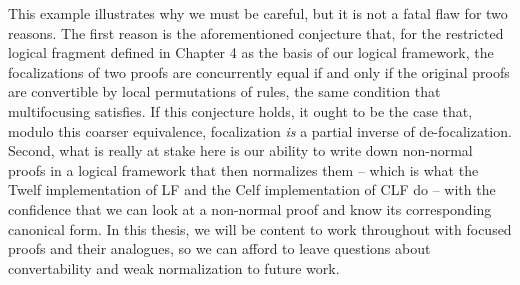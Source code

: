 This example illustrates why we must be careful, but it is not a fatal
flaw for two reasons. The first reason is the aforementioned
conjecture that, for the restricted logical fragment defined in
Chapter 4 as the basis of our logical framework, the focalizations of
two proofs are concurrently equal if and only if the original proofs
are convertible by local permutations of rules, the same condition
that multifocusing satisfies. If this conjecture holds, it ought to be
the case that, modulo this coarser equivalence, focalization {\it is}
a partial inverse of de-focalization. Second, what is really at stake
here is our ability to write down non-normal proofs in a logical
framework that then normalizes them -- which is what the Twelf
implementation of LF and the Celf implementation of CLF do -- with the
confidence that we can look at a non-normal proof and know its
corresponding canonical form. In this thesis, we will be content to
work throughout with focused proofs and their analogues, so we can
afford to leave questions about convertability and weak normalization
to future work.
